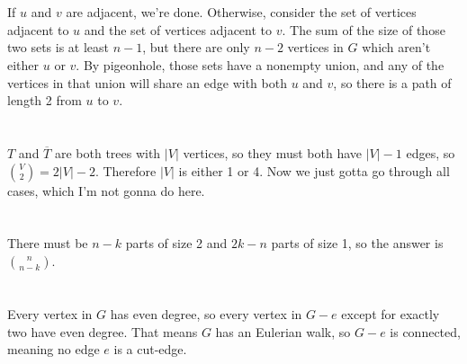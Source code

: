\documentclass[12pt]{article}
\begin{document}
\section{}
\noindent{}\bigskip\par
If $u$ and $v$ are adjacent, we're done. Otherwise, consider the set of vertices adjacent to $u$ and the set of vertices adjacent to $v$. The sum of the size of those two sets is at least $n-1$, but there are only $n-2$ vertices in $G$ which aren't either $u$ or $v$. By pigeonhole, those sets have a nonempty union, and any of the vertices in that union will share an edge with both $u$ and $v$, so there is a path of length 2 from $u$ to $v$.

\section{}
\noindent{}\bigskip\par
$T$ and $\overline{T}$ are both trees with $|V|$ vertices, so they must both have $|V|-1$ edges, so $\binom{V}{2}=2|V|-2$. Therefore $|V|$ is either 1 or 4. Now we just gotta go through all cases, which I'm not gonna do here.

\section{}
\noindent{}\bigskip\par
There must be $n-k$ parts of size 2 and $2k-n$ parts of size 1, so the answer is $\binom{n}{n-k}$.

\section{}
\noindent{}\bigskip\par

Every vertex in $G$ has even degree, so every vertex in $G-e$ except for exactly two have even degree. That means $G$ has an Eulerian walk, so $G-e$ is connected, meaning no edge $e$ is a cut-edge.
\end{document}
